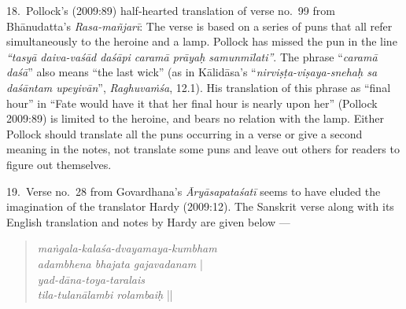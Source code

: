18.~Pollock’s (2009:89) half-hearted translation of verse no.\ 99 from Bhānudatta’s \textsl{Rasa-mañjarī}: The verse is based on a series of puns that all refer simultaneously to the heroine and a lamp. Pollock has missed the pun in the line \textsl{“tasyā daiva-vaśād daśāpi caramā prāyaḥ samunmīlati”}. The phrase “\textsl{caramā daśā}” also means “the last wick” (as in Kālidāsa’s “\textsl{nirviṣṭa-viṣaya-snehaḥ sa daśāntam upeyivān}”, \textsl{Raghuvaṁśa}, 12.1). His translation of this phrase as “final hour” in “Fate would have it that her final hour is nearly upon her” (Pollock 2009:89) is limited to the heroine, and bears no relation with the lamp. Either Pollock should translate all the puns occurring in a verse or give a second meaning in the notes, not translate some puns and leave out others for readers to figure out themselves.

19.~Verse no.\ 28 from Govardhana’s \textsl{Āryāsapataśatī} seems to have eluded the imagination of the translator Hardy (2009:12). The Sanskrit verse along with its English translation and notes by Hardy are given below --- 
\begin{quote}
\textsl{maṅgala-kalaśa-dvayamaya-kumbham}\\
\textsl{adambhena bhajata gajavadanam} |\\
\textsl{yad-dāna-toya-taralais}\\
\textsl{tila-tulanālambi rolambaiḥ} ||
\end{quote}

